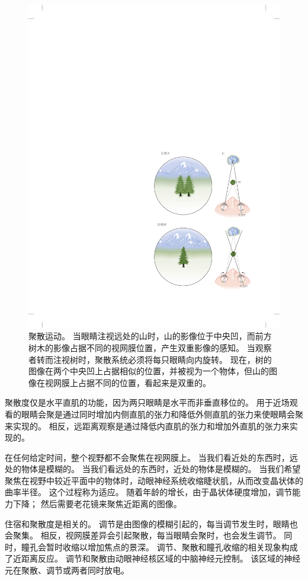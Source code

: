 \begin{figure}[htbp]
	\centering
	\includegraphics[width=0.7\linewidth]{chap35/fig_35_16}
	\caption{聚散运动。
		当眼睛注视远处的山时，山的影像位于中央凹，而前方树木的影像占据不同的视网膜位置，产生双重影像的感知。
		当观察者转而注视树时，聚散系统必须将每只眼睛向内旋转。
		现在，树的图像在两个中央凹上占据相似的位置，并被视为一个物体，但山的图像在视网膜上占据不同的位置，看起来是双重的。}
	\label{fig:35_16}
\end{figure}


聚散度仅是水平直肌的功能，因为两只眼睛是水平而非垂直移位的。
用于近场观看的眼睛会聚是通过同时增加内侧直肌的张力和降低外侧直肌的张力来使眼睛会聚来实现的。
相反，远距离观察是通过降低内直肌的张力和增加外直肌的张力来实现的。


在任何给定时间，整个视野都不会聚焦在视网膜上。
当我们看近处的东西时，远处的物体是模糊的。
当我们看远处的东西时，近处的物体是模糊的。
当我们希望聚焦在视野中较近平面中的物体时，动眼神经系统收缩睫状肌，从而改变晶状体的曲率半径。
这个过程称为适应。
随着年龄的增长，由于晶状体硬度增加，调节能力下降； 然后需要老花镜来聚焦近距离的图像。


住宿和聚散度是相关的。
调节是由图像的模糊引起的，每当调节发生时，眼睛也会聚集。
相反，视网膜差异会引起聚散，每当眼睛会聚时，也会发生调节。
同时，瞳孔会暂时收缩以增加焦点的景深。
调节、聚散和瞳孔收缩的相关现象构成了近距离反应。
调节和聚散由动眼神经核区域的中脑神经元控制。
该区域的神经元在聚散、调节或两者同时放电。



